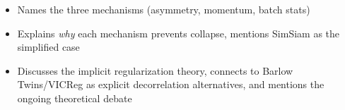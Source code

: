 \begin{interviewq}

\goodgreat
\begin{itemize}
    \item {} Names the three mechanisms (asymmetry, momentum, batch stats)
    \item {} Explains \textit{why} each mechanism prevents collapse, mentions SimSiam as the simplified case
    \item {} Discusses the implicit regularization theory, connects to Barlow Twins/VICReg as explicit decorrelation alternatives, and mentions the ongoing theoretical debate
\end{itemize}

\end{interviewq}

